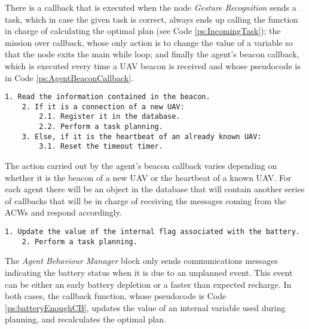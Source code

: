 There is a callback that is executed when the node \emph{Gesture Recognition} sends a task, which in case the given task is correct, always ends up calling the function in charge of calculating the optimal plan (see Code \ref{ps:IncomingTask}); the mission over callback, whose only action is to change the value of a variable so that the node exits the main while loop; and finally the agent's beacon callback, which is executed every time a \gls{UAV} beacon is received and whose pseudocode is in Code \ref{ps:AgentBeaconCallback}.

\begin{lstlisting}[caption={Agent's beacon callback}, breaklines=true, label=ps:AgentBeaconCallback]
	1. Read the information contained in the beacon.
	2. If it is a connection of a new UAV:
		2.1. Register it in the database.
		2.2. Perform a task planning.
	3. Else, if it is the heartbeat of an already known UAV:
		3.1. Reset the timeout timer.
\end{lstlisting}

The action carried out by the agent's beacon callback varies depending on whether it is the beacon of a new \gls{UAV} or the heartbeat of a known \gls{UAV}. For each agent there will be an object in the database that will contain another series of callbacks that will be in charge of receiving the messages coming from the \glspl{ACW} and respond accordingly.

\begin{lstlisting}[caption={Callback that runs when an \emph{Agent Behaviour Manager} sends battery feedback}, breaklines=true, label=ps:batteryEnoughCB]
	1. Update the value of the internal flag associated with the battery.
	2. Perform a task planning.
\end{lstlisting}

The \emph{Agent Behaviour Manager} block only sends communications messages indicating the battery status when it is due to an unplanned event. This event can be either an early battery depletion or a faster than expected recharge. In both cases, the callback function, whose pseudocode is Code \ref{ps:batteryEnoughCB}, updates the value of an internal variable used during planning, and recalculates the optimal plan.

